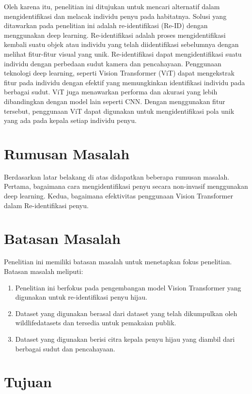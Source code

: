 Oleh karena itu, penelitian ini ditujukan untuk mencari alternatif dalam mengidentifikasi dan melacak individu penyu pada habitatnya.
Solusi yang ditawarkan pada penelitian ini adalah re-identifikasi (Re-ID) dengan menggunakan deep learning.
Re-identifikasi adalah proses mengidentifikasi kembali suatu objek atau individu yang telah diidentifikasi sebelumnya dengan melihat fitur-fitur visual yang unik.
Re-identifikasi dapat mengidentifikasi suatu individu dengan perbedaan sudut kamera dan pencahayaan.
\parencite{zheng2016personreidentificationpastpresent}
Penggunaan teknologi deep learning, seperti Vision Transformer (ViT) dapat mengekstrak fitur pada individu dengan efektif yang memungkinkan identifikasi individu pada berbagai sudut.
ViT juga menawarkan performa dan akurasi yang lebih dibandingkan dengan model lain seperti CNN.
\parencite{9716741}
Dengan menggunakan fitur tersebut, penggunaan ViT dapat digunakan untuk mengidentifikasi pola unik yang ada pada kepala setiap individu penyu.


\section{Rumusan Masalah}

Berdasarkan latar belakang di atas didapatkan beberapa rumusan masalah.
Pertama, bagaimana cara mengidentifikasi penyu secara non-invasif menggunakan deep learning.
Kedua, bagaimana efektivitas penggunaan Vision Transformer dalam Re-identifikasi penyu.

\section{Batasan Masalah}

Penelitian ini memiliki batasan masalah untuk menetapkan fokus penelitian. Batasan masalah meliputi:
\begin{enumerate}
    \item Penelitian ini berfokus pada pengembangan model Vision Transformer yang digunakan untuk re-identifikasi penyu hijau.
    \item Dataset yang digunakan berasal dari dataset yang telah dikumpulkan oleh wildlifedatasets dan tersedia untuk pemakaian publik.
    \item Dataset yang digunakan berisi citra kepala penyu hijau yang diambil dari berbagai sudut dan pencahayaan.
\end{enumerate}

\section{Tujuan}

